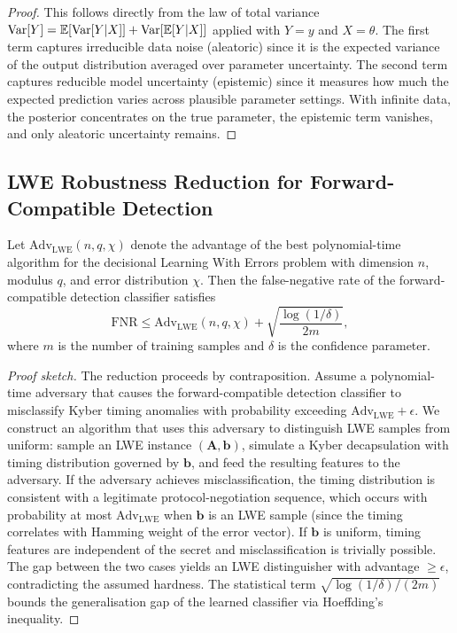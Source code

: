 \begin{proof}
This follows directly from the law of total variance $\mathrm{Var}[Y]=\mathbb{E}[\mathrm{Var}[Y|X]]+\mathrm{Var}[\mathbb{E}[Y|X]]$ applied with $Y=y$ and $X=\theta$. The first term captures irreducible data noise (aleatoric) since it is the expected variance of the output distribution averaged over parameter uncertainty. The second term captures reducible model uncertainty (epistemic) since it measures how much the expected prediction varies across plausible parameter settings. With infinite data, the posterior concentrates on the true parameter, the epistemic term vanishes, and only aleatoric uncertainty remains.
\end{proof}


\subsection{LWE Robustness Reduction for Forward-Compatible Detection}
\label{app:lwe_reduction}

\begin{proposition}
\label{prop:lwe}
Let $\mathrm{Adv}_{\mathrm{LWE}}(n,q,\chi)$ denote the advantage of the best polynomial-time algorithm for the decisional Learning With Errors problem with dimension $n$, modulus $q$, and error distribution $\chi$. Then the false-negative rate of the forward-compatible detection classifier satisfies
\begin{equation}
\mathrm{FNR} \le \mathrm{Adv}_{\mathrm{LWE}}(n,q,\chi) + \sqrt{\frac{\log(1/\delta)}{2m}},
\end{equation}
where $m$ is the number of training samples and $\delta$ is the confidence parameter.
\end{proposition}

\begin{proof}[Proof sketch]
The reduction proceeds by contraposition. Assume a polynomial-time adversary that causes the forward-compatible detection classifier to misclassify Kyber timing anomalies with probability exceeding $\mathrm{Adv}_{\mathrm{LWE}}+\epsilon$. We construct an algorithm that uses this adversary to distinguish LWE samples from uniform: sample an LWE instance $(\mathbf{A},\mathbf{b})$, simulate a Kyber decapsulation with timing distribution governed by $\mathbf{b}$, and feed the resulting features to the adversary. If the adversary achieves misclassification, the timing distribution is consistent with a legitimate protocol-negotiation sequence, which occurs with probability at most $\mathrm{Adv}_{\mathrm{LWE}}$ when $\mathbf{b}$ is an LWE sample (since the timing correlates with Hamming weight of the error vector). If $\mathbf{b}$ is uniform, timing features are independent of the secret and misclassification is trivially possible. The gap between the two cases yields an LWE distinguisher with advantage $\ge\epsilon$, contradicting the assumed hardness. The statistical term $\sqrt{\log(1/\delta)/(2m)}$ bounds the generalisation gap of the learned classifier via Hoeffding's inequality.
\end{proof}


